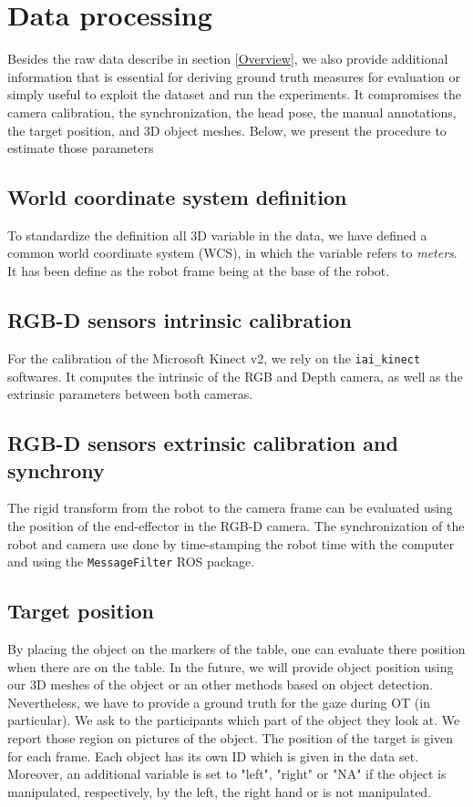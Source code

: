 \documentclass[11pt,a4paper]{article}
\begin{document}
\section{Data processing}
Besides the raw data describe in section \ref{Overview}, we also provide additional information that is essential for deriving ground truth measures for evaluation or simply useful to exploit the dataset and run the experiments. It compromises the camera calibration, the synchronization, the head pose, the manual annotations, the target position, and 3D object meshes. Below, we present the procedure to estimate those parameters

\subsection{World coordinate system definition}
To standardize the definition all 3D variable in the data, we have defined a common world coordinate system (WCS), in which the variable refers to \textit{meters}. It has been define as the robot frame being at the base of the robot.

\subsection{RGB-D sensors intrinsic calibration}
For the calibration of the Microsoft Kinect v2, we rely on the \texttt{iai\_kinect} softwares. It computes the intrinsic of the RGB and Depth camera, as well as the extrinsic parameters between both cameras.

\subsection{RGB-D sensors extrinsic calibration and synchrony}
The rigid transform from the robot to the camera frame can be evaluated using the position of the end-effector in the RGB-D camera. The synchronization of the robot and camera use done by time-stamping the robot time with the computer and using the \texttt{MessageFilter} ROS package.

\subsection{Target position}
By placing the object on the markers of the table, one can evaluate there position when there are on the table. In the future, we will provide object position using our 3D meshes of the object or an other methods based on object detection. Nevertheless, we have to provide a ground truth for the gaze during OT (in particular). We ask to the participants which part of the object they look at. We report those region on pictures of the object. The position of the target is given for each frame. Each object has its own ID which is given in the data set. Moreover, an additional variable is set to "left", "right" or "NA" if the object is manipulated, respectively, by the left, the right hand or is not manipulated.
\end{document}
